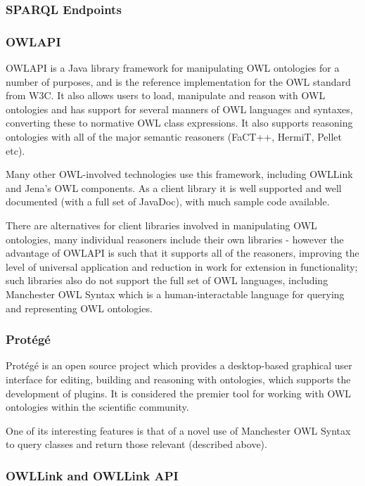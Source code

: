 \documentclass{article}
\begin{document}
\subsubsection{SPARQL Endpoints}

\subsubsection{OWLAPI}

OWLAPI is a Java library framework for manipulating OWL ontologies for a number of
purposes, and is the reference implementation for the OWL standard from W3C. 
It also allows users to load, manipulate and reason with OWL ontologies and has 
support for several manners of OWL languages and syntaxes, converting these to 
normative OWL class expressions. It also supports reasoning ontologies with all
of the major semantic reasoners (FaCT++, HermiT, Pellet etc).

Many other OWL-involved technologies use this framework, including OWLLink and Jena's 
OWL components. As a client library it is well supported and well documented
(with a full set of JavaDoc), with much sample code available.

There are alternatives for client libraries involved in manipulating OWL
ontologies, many individual reasoners include their own libraries - however the
advantage of OWLAPI is such that it supports all of the reasoners, improving
the level of universal application and reduction in work for extension in
functionality; such libraries also do not support the full set of OWL languages,
including Manchester OWL Syntax which is a human-interactable language for
querying and representing OWL ontologies.

\subsubsection{Protégé}

Protégé is an open source project which provides a desktop-based graphical user
interface for editing, building and reasoning with ontologies, which supports
the development of plugins. It is considered the premier tool for working with
OWL ontologies within the scientific community.

One of its interesting features is that of a novel use of Manchester OWL Syntax
to query classes and return those relevant (described above).

\subsubsection{OWLLink and OWLLink API}
\end{document}
